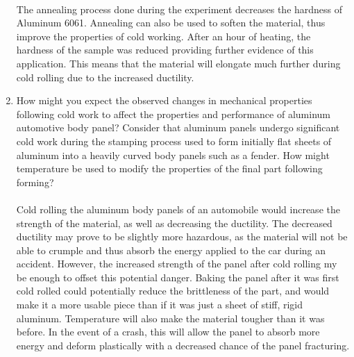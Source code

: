 \documentclass{article}
\begin{document}
\begin{enumerate}
\paragraph{}
The annealing process done during the experiment decreases the hardness of Aluminum 6061. Annealing can also be used to soften the material, thus improve the properties of cold working. After an hour of heating, the hardness of the sample was reduced providing further evidence of this application. This means that the material will elongate much further during cold rolling due to the increased ductility.

\item How might you expect the observed changes in mechanical properties following cold work to affect the properties and performance of aluminum automotive body panel? Consider that aluminum panels undergo significant cold work during the stamping process used to form initially flat sheets of aluminum into a heavily curved body panels such as a fender. How might temperature be used to modify the properties of the final part following forming? 

\paragraph{}
Cold rolling the aluminum body panels of an automobile would increase the strength of the
material, as well as decreasing the ductility.  The decreased ductility may prove to be slightly more hazardous, as the material will not be able to crumple and thus absorb the energy applied to the car during an accident. However, the increased strength of the panel after cold rolling my be enough to offset this potential danger. Baking the panel after it was first cold rolled could potentially reduce the brittleness of the part, and would make it a more usable piece than if it was just a sheet of stiff, rigid aluminum.  Temperature will also make the material tougher than it was before. In the event of a crash, this will allow the panel to absorb more energy and deform plastically with a decreased chance of the panel fracturing.



\end{enumerate}
\end{document}
